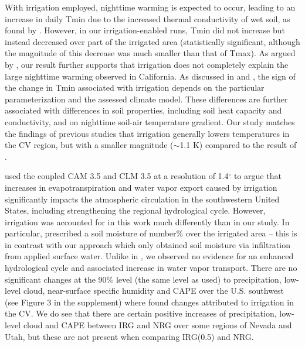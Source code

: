 \documentclass[draft,ms]{agutex}   %
\begin{document}
\begin{article}
With irrigation employed, nighttime warming is expected to occur, leading to an increase in daily Tmin due to the increased thermal conductivity of wet soil, as found by \cite{kanamaru2008model}. However, in our irrigation-enabled runs, Tmin did not increase but instead decreased over part of the irrigated area (statistically significant, although the magnitude of this decrease was much smaller than that of Tmax). As argued by \cite{bonfils2007empirical}, our result further supports that irrigation does not completely explain the large nighttime warming observed in California. As discussed in \cite{kueppers2008seasonal} and \cite{kanamaru2008model}, the sign of the change in Tmin associated with irrigation depends on the particular parameterization and the assessed climate model.  These differences are further associated with differences in soil properties, including soil heat capacity and conductivity, and on nighttime soil-air temperature gradient. Our study matches the findings of previous studies that irrigation generally lowers temperatures in the CV region, but with a smaller magnitude ($\sim$1.1 K) compared to the result of \citet{lobell2006biogeophysical}. 


\cite{lo2013irrigation} used the coupled CAM 3.5 and CLM 3.5 at a resolution of 1.4$^\circ$ to argue that increases in evapotranspiration and water vapor export caused by irrigation significantly impacts the atmospheric circulation in the southwestern United States, including strengthening the regional hydrological cycle. However, irrigation was accounted for in this work much differently than in our study.  In particular, \cite{lo2013irrigation} prescribed a soil moisture of {\color{red}number}\% over the irrigated area -- this is in contrast with our approach which only obtained soil moisture via infiltration from applied surface water.  Unlike in \cite{lo2013irrigation}, we observed no evidence for an enhanced hydrological cycle and associated increase in water vapor transport. There are no significant changes at the 90$\%$ level (the same level as \cite{lo2013irrigation} used) to precipitation, low-level cloud, near-surface specific humidity and CAPE over the U.S. southwest (see Figure 3 in the supplement) where \cite{lo2013irrigation} found changes attributed to irrigation in the CV. We do see that there are certain positive increases of precipitation, low-level cloud and CAPE between IRG and NRG over some regions of Nevada and Utah, but these are not present when comparing IRG(0.5) and NRG. %


\end{article}
\end{document}

